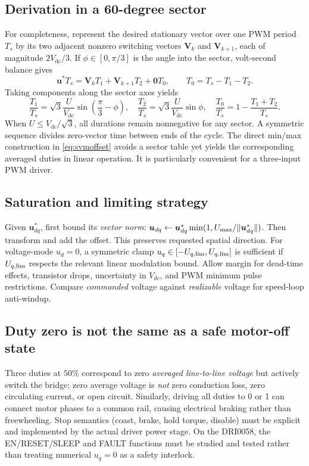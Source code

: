 \documentclass[10pt,letterpaper]{article}
\newcommand{\Vdc}{V_{\mathrm{dc}}}
\begin{document}
\subsection{Derivation in a 60-degree sector}
For completeness, represent the desired stationary vector over one PWM period $T_s$ by its two adjacent nonzero switching vectors $\bm V_k$ and $\bm V_{k+1}$, each of magnitude $2\Vdc/3$. If $\phi\in[0,\pi/3]$ is the angle into the sector, volt-second balance gives
\begin{equation}
\bm u^* T_s=\bm V_k T_1+\bm V_{k+1}T_2+\bm0 T_0,
\qquad T_0=T_s-T_1-T_2.
\end{equation}
Taking components along the sector axes yields
\begin{equation}\label{eq:svtimes}
\frac{T_1}{T_s}=\sqrt3\frac{U}{\Vdc}\sin\left(\frac\pi3-\phi\right),\quad
\frac{T_2}{T_s}=\sqrt3\frac{U}{\Vdc}\sin\phi,\quad
\frac{T_0}{T_s}=1-\frac{T_1+T_2}{T_s}.
\end{equation}
When $U\le\Vdc/\sqrt3$, all durations remain nonnegative for any sector. A symmetric sequence divides zero-vector time between ends of the cycle. The direct min/max construction in \eqref{eq:svmoffset} avoids a sector table yet yields the corresponding averaged duties in linear operation. It is particularly convenient for a three-input PWM driver.

\subsection{Saturation and limiting strategy}
Given $\bm u_{dq}^*$, first bound its \emph{vector norm}: $\bm u_{dq}\leftarrow\bm u_{dq}^*\min(1,U_{\rm max}/\|\bm u_{dq}^*\|)$. Then transform and add the offset. This preserves requested spatial direction. For voltage-mode $u_d=0$, a symmetric clamp $u_q\in[-U_{q,\rm lim},U_{q,\rm lim}]$ is sufficient if $U_{q,\rm lim}$ respects the relevant linear modulation bound. Allow margin for dead-time effects, transistor drops, uncertainty in $V_{dc}$, and PWM minimum pulse restrictions. Compare \emph{commanded} voltage against \emph{realizable} voltage for speed-loop anti-windup.

\subsection{Duty zero is not the same as a safe motor-off state}
Three duties at $50\%$ correspond to zero \emph{averaged line-to-line voltage} but actively switch the bridge; zero average voltage is \emph{not} zero conduction loss, zero circulating current, or open circuit. Similarly, driving all duties to 0 or 1 can connect motor phases to a common rail, causing electrical braking rather than freewheeling. Stop semantics (coast, brake, hold torque, disable) must be explicit and implemented by the actual driver power stage. On the DRI0058, the EN/RESET/SLEEP and FAULT functions must be studied and tested rather than treating numerical $u_q=0$ as a safety interlock.
\end{document}
